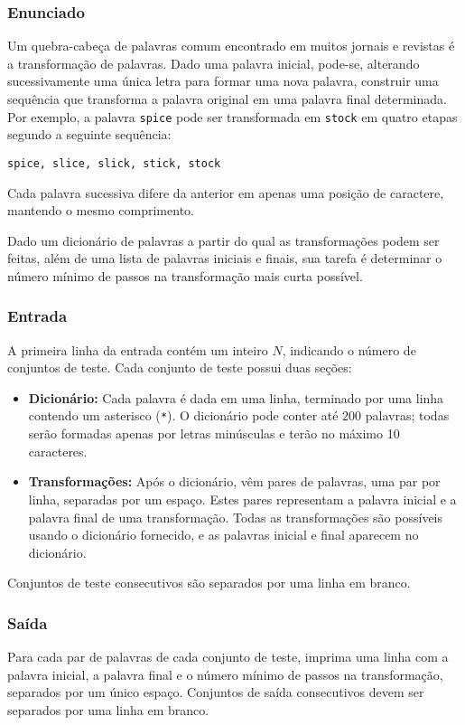 \subsubsection*{Enunciado}
Um quebra-cabeça de palavras comum encontrado em muitos jornais e revistas é a transformação de palavras. Dado uma palavra inicial, pode-se, alterando sucessivamente uma única letra para formar uma nova palavra, construir uma sequência que transforma a palavra original em uma palavra final determinada. Por exemplo, a palavra \texttt{spice} pode ser transformada em \texttt{stock} em quatro etapas segundo a seguinte sequência:
\begin{center}
\texttt{spice, slice, slick, stick, stock}
\end{center}
Cada palavra sucessiva difere da anterior em apenas uma posição de caractere, mantendo o mesmo comprimento.

Dado um dicionário de palavras a partir do qual as transformações podem ser feitas, além de uma lista de palavras iniciais e finais, sua tarefa é determinar o número mínimo de passos na transformação mais curta possível.

\subsubsection*{Entrada}
A primeira linha da entrada contém um inteiro \(N\), indicando o número de conjuntos de teste. Cada conjunto de teste possui duas seções:
\begin{itemize}
    \item \textbf{Dicionário:} Cada palavra é dada em uma linha, terminado por uma linha contendo um asterisco (\texttt{*}). O dicionário pode conter até 200 palavras; todas serão formadas apenas por letras minúsculas e terão no máximo 10 caracteres.
    \item \textbf{Transformações:} Após o dicionário, vêm pares de palavras, uma par por linha, separadas por um espaço. Estes pares representam a palavra inicial e a palavra final de uma transformação. Todas as transformações são possíveis usando o dicionário fornecido, e as palavras inicial e final aparecem no dicionário.
\end{itemize}
Conjuntos de teste consecutivos são separados por uma linha em branco.

\subsubsection*{Saída}
Para cada par de palavras de cada conjunto de teste, imprima uma linha com a palavra inicial, a palavra final e o número mínimo de passos na transformação, separados por um único espaço. Conjuntos de saída consecutivos devem ser separados por uma linha em branco.

